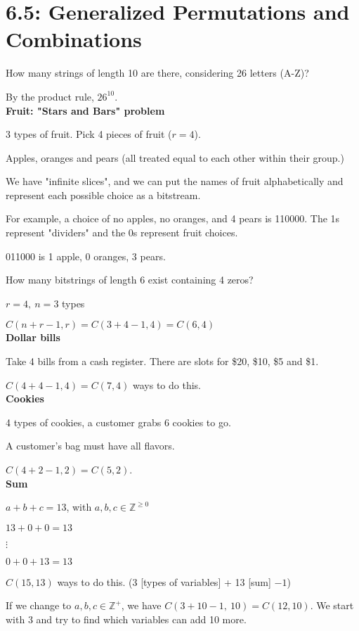 \documentclass[english]{exam}
\begin{document}
	
    \section{6.5: Generalized Permutations and Combinations}
    
    How many strings of length 10 are there, considering 26 letters (A-Z)?
    
    By the product rule, $26^{10}$.\\
    
    \textbf{Fruit: "Stars and Bars" problem}
    
    3 types of fruit. Pick 4 pieces of fruit ($r=4$).
    
    Apples, oranges and pears (all treated equal to each other within their group.)
    
    We have "infinite slices", and we can put the names of fruit alphabetically and represent each possible choice as a bitstream.
    
    For example, a choice of no apples, no oranges, and 4 pears is 110000. The 1s represent "dividers" and the 0s represent fruit choices.
    
    011000 is 1 apple, 0 oranges, 3 pears. 
    
    How many bitstrings of length 6 exist containing 4 zeros?
    
    $r = 4,\ n = 3$ types
    
    $C(n+r-1, r) = C(3+4-1, 4) = C(6,4)$\\
    
    \textbf{Dollar bills}
    
    Take 4 bills from a cash register. There are slots for \$20, \$10, \$5 and \$1.
    
    $C(4+4-1, 4) = C(7,4)$ ways to do this.\\
    
    \textbf{Cookies}
    
    4 types of cookies, a customer grabs 6 cookies to go.
    
    A customer's bag must have all flavors.
    
    $C(4+2-1, 2) = C(5,2)$.\\
    
    \textbf{Sum}
    
    $a+b+c = 13$, with $a,b,c \in \mathbb Z^{\geq 0}$
    
    $13 + 0 + 0 = 13$
    
    $\vdots$
    
    $0 + 0 + 13 = 13$
    
    $C(15,13)$ ways to do this. (3 [types of variables] + 13 [sum] $- 1$)
    
    If we change to $a,b,c \in \mathbb Z^+$, we have $C(3 + 10 - 1,\ 10) = C(12,10)$. We start with 3 and try to find which variables can add 10 more.
    
    
\end{document}

